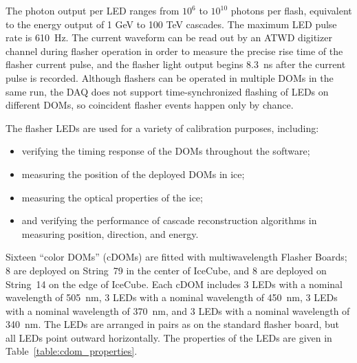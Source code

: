 
The photon output per LED ranges from $10^6$ to $10^{10}$ photons per flash,
equivalent to the energy output of 1 GeV to 100 TeV cascades. The maximum
LED pulse rate is 610~Hz. The current waveform can be read out by an ATWD
digitizer channel during flasher operation in order to measure the
precise rise time of the flasher current pulse, and the flasher light output
begins 8.3~ns after the current pulse is recorded.  Although flashers can be
operated in multiple DOMs in the same run, the DAQ does not support
time-synchronized flashing of LEDs on different DOMs, so coincident flasher
events happen only by chance. 

The flasher LEDs are used for a variety of calibration purposes, including:
\begin{itemize}
\item verifying the timing response of the DOMs throughout the
  software;
\item measuring the position of the deployed DOMs in ice;
\item measuring the optical properties of the ice;
\item and verifying the performance of cascade reconstruction algorithms
  in measuring position, direction, and energy.
\end{itemize}

Sixteen ``color DOMs'' (cDOMs) are fitted with multiwavelength
Flasher Boards; 8 are deployed on String~79 in the center of IceCube, and 8
are deployed on String~14 on the edge of IceCube.  Each cDOM includes 3 LEDs with a nominal
wavelength of 505~nm, 3 LEDs with a nominal wavelength of 450~nm, 3
LEDs with a nominal wavelength of 370~nm, and 3 LEDs with a nominal
wavelength of 340~nm. The LEDs are arranged in pairs as on the
standard flasher board, but all LEDs point outward horizontally. The
properties of the LEDs are given in Table~\ref{table:cdom_properties}.

